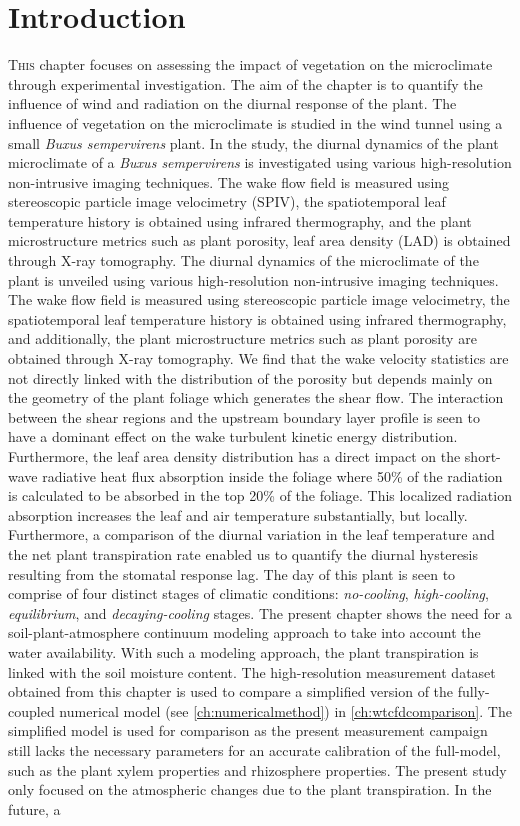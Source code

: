 \section{Introduction}
\lettrine[lines=3,nindent=0em,loversize=0.1]{T}{his} chapter focuses on assessing the impact of vegetation on the microclimate through experimental investigation. The aim of the chapter is to quantify the influence of wind and radiation on the diurnal response of the plant. The influence of vegetation on the microclimate is studied in the wind tunnel using a small \textit{Buxus sempervirens} plant. In the study, the diurnal dynamics of the plant microclimate of a \textit{Buxus sempervirens} is investigated using various high-resolution non-intrusive imaging techniques. The wake flow field is measured using stereoscopic particle image velocimetry (SPIV), the spatiotemporal leaf temperature history is obtained using infrared thermography, and the plant microstructure metrics such as plant porosity, leaf area density (LAD) is obtained through X-ray tomography. The diurnal dynamics of the microclimate of the plant is unveiled using various high-resolution non-intrusive imaging techniques. The wake flow field is measured using stereoscopic particle image velocimetry, the spatiotemporal leaf temperature history is obtained using infrared thermography, and additionally, the plant microstructure metrics such as plant porosity are obtained through X-ray tomography. We find that the wake velocity statistics are not directly linked with the distribution of the porosity but depends mainly on the geometry of the plant foliage which generates the shear flow. The interaction between the shear regions and the upstream boundary layer profile is seen to have a dominant effect on the wake turbulent kinetic energy distribution. Furthermore, the leaf area density distribution has a direct impact on the short-wave radiative heat flux absorption inside the foliage where 50\% of the radiation is calculated to be absorbed in the top 20\% of the foliage. This localized radiation absorption increases the leaf and air temperature substantially, but locally. Furthermore, a comparison of the diurnal variation in the leaf temperature and the net plant transpiration rate enabled us to quantify the diurnal hysteresis resulting from the stomatal response lag. The day of this plant is seen to comprise of four distinct stages of climatic conditions: \textit{no-cooling}, \textit{high-cooling}, \textit{equilibrium}, and \textit{decaying-cooling} stages. The present chapter shows the need for a soil-plant-atmosphere continuum modeling approach to take into account the water availability. With such a modeling approach, the plant transpiration is linked with the soil moisture content. The high-resolution measurement dataset obtained from this chapter is used to compare a simplified version of the fully-coupled numerical model (see \cref{ch:numericalmethod}) in \cref{ch:wtcfdcomparison}. The simplified model is used for comparison as the present measurement campaign still lacks the necessary parameters for an accurate calibration of the full-model, such as the plant xylem properties and rhizosphere properties. The present study only focused on the atmospheric changes due to the plant transpiration. In the future, a 